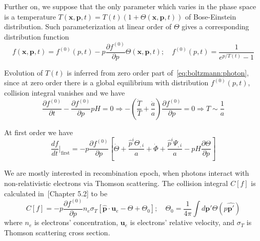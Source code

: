 \documentclass[12pt]{extarticle}
\numberwithin{problem}{section}
\numberwithin{theorem}{section}
\begin{document}
	Further on, we suppose that the only parameter which varies in the phase space is a temperature $T(\mathbf{x}, \mathbf{p}, t) = T(t)(1 + \Theta(\mathbf{x}, \mathbf{p}, t))$ of Bose-Einstein distribution. Such parameterization at linear order of $\Theta$ gives a corresponding distribution function
	\begin{equation}
		f(\mathbf{x}, \mathbf{p}, t) = f^{(0)}(p, t) - p\frac{\partial f^{(0)}}{\partial p}\Theta(\mathbf{x}, \mathbf{p}, t);\quad f^{(0)}(p, t) = \frac{1}{e^{p / T(t)} - 1}
	\end{equation} 

	Evolution of $T(t)$ is inferred from zero order part of~\ref{eq:boltzmann:photon}, since at zero order there is a global equilibrium with distribution $f^{(0)}(p, t)$, collision integral vanishes and we have
	\begin{equation}
		\frac{\partial f^{(0)}}{\partial t} - \frac{\partial f^{(0)}}{\partial p}pH = 0\Rightarrow -\left(\frac{\dot{T}}{T} + \frac{\dot{a}}{a}\right)\frac{\partial f^{(0)}}{\partial p} = 0\Rightarrow T\sim\frac{1}{a}
	\end{equation}

	At first order we have
	\begin{equation}
		\label{eq:boltzmann:photon-first}
		\frac{df}{dt}\Big\lvert_{\text{first}} = -p\frac{\partial f^{(0)}}{\partial p}\left[\dot{\Theta} + \frac{\hat{p}^i\Theta_{,i}}{a} + \dot{\Phi} + \frac{\hat{p}^i\Psi_{,i}}{a} - pH\frac{\partial\Theta}{\partial p}\right]
	\end{equation}

	We are mostly interested in recombination epoch, when photons interact with non-relativistic electrons via Thomson scattering. The collision integral $C[f]$ is calculated in~\cite{dodelson:2003}[Chapter 5.2] to be
	\begin{equation}
		\label{eq:collision:photon}
		C[f] = -p\frac{\partial f^{(0)}}{\partial p}n_e\sigma_T\left[\mathbf{\hat{p}}\cdot\mathbf{u}_e - \Theta + \Theta_0\right];\quad \Theta_0 = \frac{1}{4\pi}\int d\mathbf{\hat{p'}}\Theta(p\mathbf{\hat{p'}})
	\end{equation}
	where $n_e$ is electrons' concentration, $\mathbf{u}_e$ is electrons' relative velocity, and $\sigma_T$ is Thomson scattering cross section.
\end{document}
